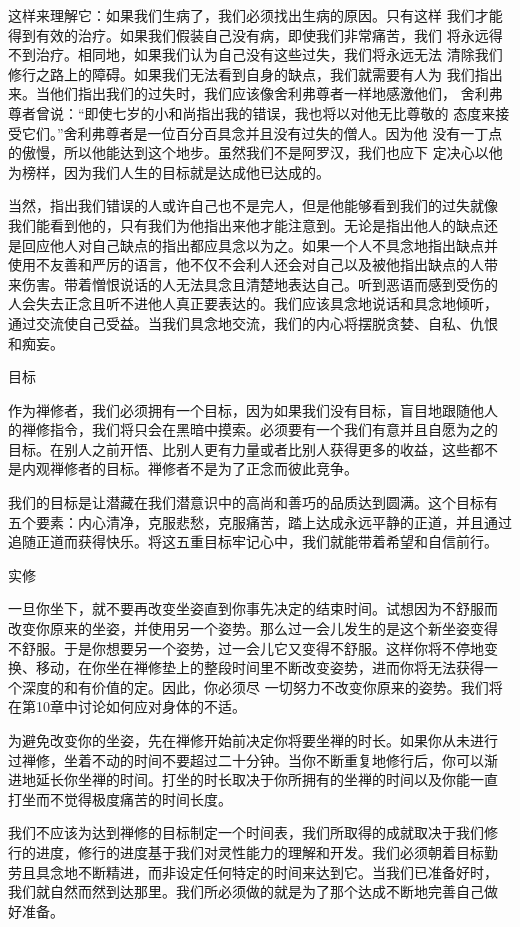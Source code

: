 这样来理解它：如果我们生病了，我们必须找出生病的原因。只有这样
我们才能得到有效的治疗。如果我们假装自己没有病，即使我们非常痛苦，我们
将永远得不到治疗。相同地，如果我们认为自己没有这些过失，我们将永远无法
清除我们修行之路上的障碍。如果我们无法看到自身的缺点，我们就需要有人为
我们指出来。当他们指出我们的过失时，我们应该像舍利弗尊者一样地感激他们，
舍利弗尊者曾说：“即使七岁的小和尚指出我的错误，我也将以对他无比尊敬的
态度来接受它们。”舍利弗尊者是一位百分百具念并且没有过失的僧人。因为他
没有一丁点的傲慢，所以他能达到这个地步。虽然我们不是阿罗汉，我们也应下
定决心以他为榜样，因为我们人生的目标就是达成他已达成的。

当然，指出我们错误的人或许自己也不是完人，但是他能够看到我们的过失就像
我们能看到他的，只有我们为他指出来他才能注意到。无论是指出他人的缺点还
是回应他人对自己缺点的指出都应具念以为之。如果一个人不具念地指出缺点并
使用不友善和严厉的语言，他不仅不会利人还会对自己以及被他指出缺点的人带
来伤害。带着憎恨说话的人无法具念且清楚地表达自己。听到恶语而感到受伤的
人会失去正念且听不进他人真正要表达的。我们应该具念地说话和具念地倾听，
通过交流使自己受益。当我们具念地交流，我们的内心将摆脱贪婪、自私、仇恨
和痴妄。

\subsectcnon 目标

作为禅修者，我们必须拥有一个目标，因为如果我们没有目标，盲目地跟随他人
的禅修指令，我们将只会在黑暗中摸索。必须要有一个我们有意并且自愿为之的
目标。在别人之前开悟、比别人更有力量或者比别人获得更多的收益，这些都不
是内观禅修者的目标。禅修者不是为了正念而彼此竞争。

我们的目标是让潜藏在我们潜意识中的高尚和善巧的品质达到圆满。这个目标有
五个要素：内心清净，克服悲愁，克服痛苦，踏上达成永远平静的正道，并且通过
追随正道而获得快乐。将这五重目标牢记心中，我们就能带着希望和自信前行。

\vfill
\subsectcnon 实修

一旦你坐下，就不要再改变坐姿直到你事先决定的结束时间。试想因为不舒服而
改变你原来的坐姿，并使用另一个姿势。那么过一会儿发生的是这个新坐姿变得
不舒服。于是你想要另一个姿势，过一会儿它又变得不舒服。这样你将不停地变
换、移动，在你坐在禅修垫上的整段时间里不断改变姿势，进而你将无法获得一
个深度的和有价值的定。因此，你必须尽
一切努力不改变你原来的姿势。我们将在第10章中讨论如何应对身体的不适。

为避免改变你的坐姿，先在禅修开始前决定你将要坐禅的时长。如果你从未进行
过禅修，坐着不动的时间不要超过二十分钟。当你不断重复地修行后，你可以渐
进地延长你坐禅的时间。打坐的时长取决于你所拥有的坐禅的时间以及你能一直
打坐而不觉得极度痛苦的时间长度。

我们不应该为达到禅修的目标制定一个时间表，我们所取得的成就取决于我们修
行的进度，修行的进度基于我们对灵性能力的理解和开发。我们必须朝着目标勤
劳且具念地不断精进，而非设定任何特定的时间来达到它。当我们已准备好时，
我们就自然而然到达那里。我们所必须做的就是为了那个达成不断地完善自己做
好准备。

\endchapter

\byebye
